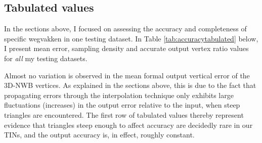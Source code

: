 \subsection{Tabulated values}
\label{sub:accuracytabulated}

In the sections above, I focused on assessing the accuracy and completeness of specific wegvakken in one testing dataset. In Table \ref{tab:accuracytabulated} below, I present mean error, sampling density and accurate output vertex ratio values for \textit{all} my testing datasets.

\begin{table}
    \caption{Tabulated 3D-NWB accuracy and completeness results per testing dataset \label{tab:accuracytabulated}}
\end{table}

Almost no variation is observed in the mean formal output vertical error of the 3D-NWB vertices. As explained in the sections above, this is due to the fact that propagating errors through the interpolation technique only exhibits large fluctuations (increases) in the output error relative to the input, when steep triangles are encountered. The first row of tabulated values thereby represent evidence that triangles steep enough to affect accuracy are decidedly rare in our TINs, and the output accuracy is, in effect, roughly constant.

